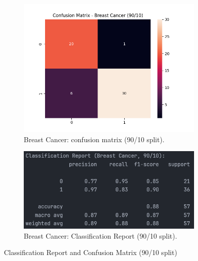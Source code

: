 \begin{figure}[H]
	\centering
	\begin{subfigure}{0.45\textwidth}
		\centering
		\includegraphics[width=\textwidth]{imgs/confusion_mat/confusion_mat__breast_cancer__90_vs_10.png}
		\caption{Breast Cancer: confusion matrix (90/10 split).}\label{fig:bc-cm-90-10}
	\end{subfigure}
	\hfill
	\begin{subfigure}{0.45\textwidth}
		\centering
		\includegraphics[width=\textwidth]{imgs/confusion_mat/class_rp__breast_cancer__90_vs_10.png}
		\caption{Breast Cancer: Classification Report (90/10 split).}\label{fig:bc-cr-90-10}
	\end{subfigure}

	\caption{Classification Report and Confusion Matrix (90/10 split)}\label{fig:bc-eval-90-10}
\end{figure}

